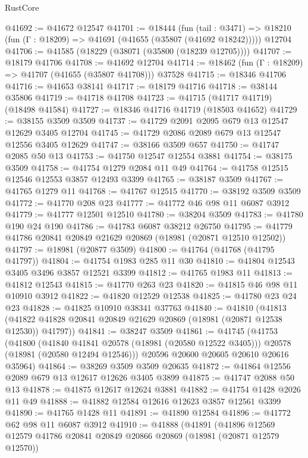 \begin{lexlean}{RustCore}
\begin{coremodule}
@41692 := @41672 @12547
@41701 := @18444
    (fun (tail : @3471) => @18210 (fun (Γ : @18209) => @41691 (@41655 (@35807 (@41692 @18242)))))
    @12704
@41706 := @41585 (@18229 (@38071 (@35800 (@18239 @12705))))
@41707 := @18179 @41706
@41708 := @41692 @12704
@41714 := @18462 (fun (Γ : @18209) => @41707 (@41655 (@35807 @41708))) @37528
@41715 := @18346 @41706
@41716 := @41653 @38141
@41717 := @18179 @41716
@41718 := @38144 @35806
@41719 := @41718 @41708
@41723 := @41715 (@41717 @41719) (@18498 @41584)
@41727 := @18346 @41716 @41719 (@18503 @41652)
@41729 := @38155 @3509 @3509
@41737 := @41729 @2091 @2095 @679 @13 @12547 @12629 @3405 @12704
@41745 := @41729 @2086 @2089 @679 @13 @12547 @12556 @3405 @12629
@41747 := @38166 @3509 @657
@41750 := @41747 @2085 @50 @13
@41753 := @41750 @12547 @12554 @3881
@41754 := @38175 @3509
@41758 := @41754 @1279 @2084 @11 @49
@41764 := @41758 @12515 @12546 @12553 @3857 @12493 @3399
@41765 := @38187 @3509
@41767 := @41765 @1279 @11
@41768 := @41767 @12515
@41770 := @38192 @3509 @3509
@41772 := @41770 @208 @23
@41777 := @41772 @46 @98 @11 @6087 @3912
@41779 := @41777 @12501 @12510
@41780 := @38204 @3509
@41783 := @41780 @190 @24 @190
@41786 := @41783 @6087 @38212 @26750
@41795 := @41779 @41786 @20841 @20849 @21629 @20869 (@18981 (@20871 @12510 @12502))
@41797 := @18981 (@20877 @3509)
@41800 := @41764 (@41768 (@41795 @41797))
@41804 := @41754 @1983 @285 @11 @30
@41810 := @41804 @12543 @3405 @3496 @3857 @12521 @3399
@41812 := @41765 @1983 @11
@41813 := @41812 @12543
@41815 := @41770 @263 @23
@41820 := @41815 @46 @98 @11 @10910 @3912
@41822 := @41820 @12529 @12538
@41825 := @41780 @23 @24 @23
@41828 := @41825 @10910 @38341 @37763
@41840 := @41810
    (@41813 (@41822 @41828 @20841 @20849 @21629 @20869 (@18981 (@20871 @12538 @12530)) @41797))
@41841 := @38247 @3509
@41861 := @41745
    (@41753
      (@41800
        (@41840 @41841 @20578 (@18981 (@20580 @12522 @3405)))
        @20578
        (@18981 (@20580 @12494 @12546)))
      @20596
      @20600
      @20605
      @20610
      @20616
      @35964)
@41864 := @38269 @3509 @3509 @20635
@41872 := @41864 @12556 @2089 @679 @13 @12617 @12626 @3405 @3899
@41875 := @41747 @2088 @50 @13
@41878 := @41875 @12617 @12624 @3881
@41882 := @41754 @1428 @2026 @11 @49
@41888 := @41882 @12584 @12616 @12623 @3857 @12561 @3399
@41890 := @41765 @1428 @11
@41891 := @41890 @12584
@41896 := @41772 @62 @98 @11 @6087 @3912
@41910 := @41888
    (@41891
      (@41896
        @12569
        @12579
        @41786
        @20841
        @20849
        @20866
        @20869
        (@18981 (@20871 @12579 @12570))

\end{coremodule}
\end{lexlean}
